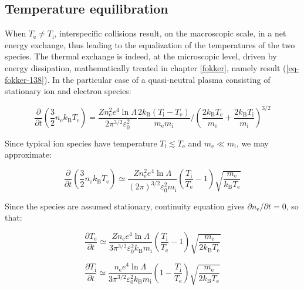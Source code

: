 \subsection{Temperature equilibration}

When $T_\text{e}\neq T_\mathrm{i}$, interspecific collisions result, on the macroscopic scale, in a net energy exchange, thus leading to the equalization of the temperatures of the two species. The thermal exchange is indeed, at the microscopic level, driven by energy dissipation, mathematically treated in chapter \ref{fokker}, namely result (\ref{eq-fokker-138}). In the particular case of a quasi-neutral plasma consisting of stationary ion and electron species:

\begin{equation}
    \frac{\partial}{\partial t}\left(\frac{3}{2}n_\text{e} k_\mathrm{B}T_\text{e}\right)=\frac{Zn_\text{e}^2e^4\ln{\Lambda}}{2\pi^{3/2}\varepsilon_0^2}\frac{2k_\mathrm{B}(T_\mathrm{i}-T_\text{e})}{m_\text{e}m_\mathrm{i}}\bigg/\left(\frac{2k_\mathrm{B}T_\text{e}}{m_\text{e}}+\frac{2k_\mathrm{B}T_\mathrm{i}}{m_\mathrm{i}}\right)^{3/2}
\end{equation}

Since typical ion species have temperature $T_\mathrm{i}\lesssim T_\text{e}$ and $m_\text{e}\ll m_\mathrm{i}$, we may approximate:

\begin{equation}
    \frac{\partial}{\partial t}\left(\frac{3}{2}n_\text{e} k_\mathrm{B}T_\text{e}\right)\simeq\frac{Zn_\text{e}^2e^4\ln{\Lambda}}{(2\pi)^{3/2}\varepsilon_0^2m_\mathrm{i}}\left(\frac{T_\mathrm{i}}{T_\text{e}}-1\right)\sqrt{\frac{m_\text{e}}{k_\mathrm{B}T_\text{e}}}
\end{equation}

Since the species are assumed stationary, continuity equation gives $\partial n_\text{e}/\partial t=0$, so that:

\begin{equation}
    \frac{\partial T_\text{e}}{\partial t}\simeq\frac{Zn_\text{e}e^4\ln{\Lambda}}{3\pi^{3/2}\varepsilon_0^2k_\mathrm{B}m_\mathrm{i}}\left(\frac{T_\mathrm{i}}{T_\text{e}}-1\right)\sqrt{\frac{m_\text{e}}{2k_\mathrm{B}T_\text{e}}}
\end{equation}

\begin{equation}
    \frac{\partial T_\mathrm{i}}{\partial t}\simeq\frac{n_\text{e}e^4\ln{\Lambda}}{3\pi^{3/2}\varepsilon_0^2k_\mathrm{B}m_\mathrm{i}}\left(1-\frac{T_\mathrm{i}}{T_\text{e}}\right)\sqrt{\frac{m_\text{e}}{2k_\mathrm{B}T_\text{e}}}
\end{equation}